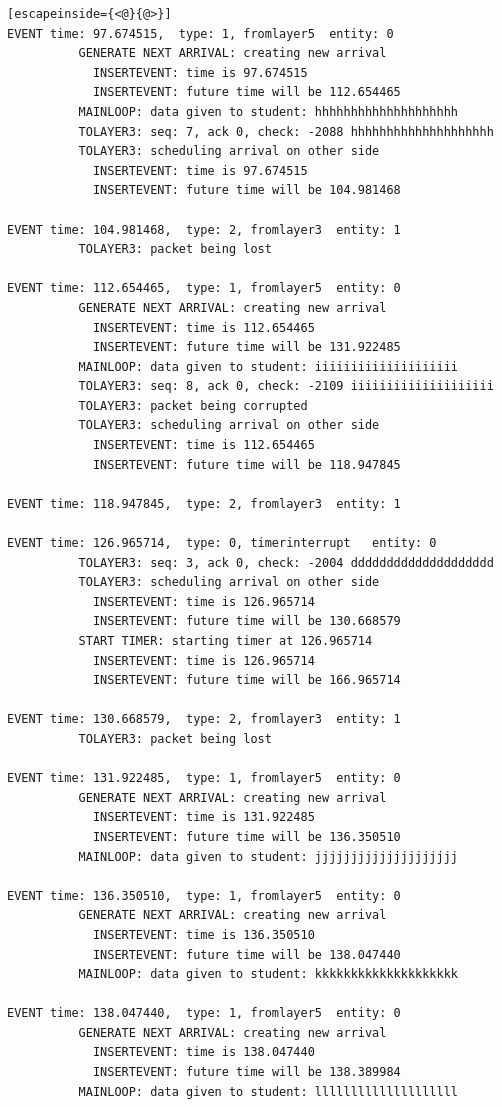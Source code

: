\documentclass[paper=a4, fontsize=11pt]{scrartcl}
\numberwithin{equation}{section}		%
\numberwithin{figure}{section}			%
\numberwithin{table}{section}				%
\begin{document}
\begin{lstlisting}[escapeinside={<@}{@>}]
EVENT time: 97.674515,  type: 1, fromlayer5  entity: 0
          GENERATE NEXT ARRIVAL: creating new arrival
            INSERTEVENT: time is 97.674515
            INSERTEVENT: future time will be 112.654465
          MAINLOOP: data given to student: hhhhhhhhhhhhhhhhhhhh
          TOLAYER3: seq: 7, ack 0, check: -2088 hhhhhhhhhhhhhhhhhhhh
          TOLAYER3: scheduling arrival on other side
            INSERTEVENT: time is 97.674515
            INSERTEVENT: future time will be 104.981468

EVENT time: 104.981468,  type: 2, fromlayer3  entity: 1
          TOLAYER3: packet being lost

EVENT time: 112.654465,  type: 1, fromlayer5  entity: 0
          GENERATE NEXT ARRIVAL: creating new arrival
            INSERTEVENT: time is 112.654465
            INSERTEVENT: future time will be 131.922485
          MAINLOOP: data given to student: iiiiiiiiiiiiiiiiiiii
          TOLAYER3: seq: 8, ack 0, check: -2109 iiiiiiiiiiiiiiiiiiii
          TOLAYER3: packet being corrupted
          TOLAYER3: scheduling arrival on other side
            INSERTEVENT: time is 112.654465
            INSERTEVENT: future time will be 118.947845

EVENT time: 118.947845,  type: 2, fromlayer3  entity: 1

EVENT time: 126.965714,  type: 0, timerinterrupt   entity: 0
          TOLAYER3: seq: 3, ack 0, check: -2004 dddddddddddddddddddd
          TOLAYER3: scheduling arrival on other side
            INSERTEVENT: time is 126.965714
            INSERTEVENT: future time will be 130.668579
          START TIMER: starting timer at 126.965714
            INSERTEVENT: time is 126.965714
            INSERTEVENT: future time will be 166.965714

EVENT time: 130.668579,  type: 2, fromlayer3  entity: 1
          TOLAYER3: packet being lost

EVENT time: 131.922485,  type: 1, fromlayer5  entity: 0
          GENERATE NEXT ARRIVAL: creating new arrival
            INSERTEVENT: time is 131.922485
            INSERTEVENT: future time will be 136.350510
          MAINLOOP: data given to student: jjjjjjjjjjjjjjjjjjjj

EVENT time: 136.350510,  type: 1, fromlayer5  entity: 0
          GENERATE NEXT ARRIVAL: creating new arrival
            INSERTEVENT: time is 136.350510
            INSERTEVENT: future time will be 138.047440
          MAINLOOP: data given to student: kkkkkkkkkkkkkkkkkkkk

EVENT time: 138.047440,  type: 1, fromlayer5  entity: 0
          GENERATE NEXT ARRIVAL: creating new arrival
            INSERTEVENT: time is 138.047440
            INSERTEVENT: future time will be 138.389984
          MAINLOOP: data given to student: llllllllllllllllllll


\end{lstlisting}
\end{document}
